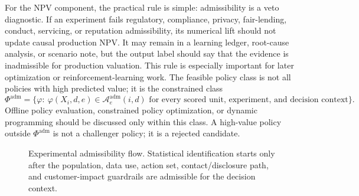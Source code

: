 \documentclass[11pt]{article}
\newcommand{\1}{\mathbf{1}}
\begin{document}
For the NPV component, the practical rule is simple: admissibility is a veto
diagnostic. If an experiment fails regulatory, compliance, privacy,
fair-lending, conduct, servicing, or reputation admissibility, its numerical
lift should not update causal production NPV. It may remain in a learning
ledger, root-cause analysis, or scenario note, but the output label should say
that the evidence is inadmissible for production valuation. This rule is
especially important for later optimization or reinforcement-learning work.
The feasible policy class is not all policies with high predicted value; it is
the constrained class
\begin{equation}
  \Phi^{\mathrm{adm}}
  =
  \{\varphi:\ \varphi(X_i,d,e)\in
    \mathcal{A}^{\mathrm{adm}}_e(i,d)
    \text{ for every scored unit, experiment, and decision context}\}.
  \label{eq:admissible-policy-class}
\end{equation}
Offline policy evaluation, constrained policy optimization, or dynamic
programming should be discussed only within this class. A high-value policy
outside $\Phi^{\mathrm{adm}}$ is not a challenger policy; it is a rejected
candidate.

\begin{figure}[t]
\centering
{}
\caption{Experimental admissibility flow. Statistical identification starts only
after the population, data use, action set, contact/disclosure path, and
customer-impact guardrails are admissible for the decision context.}
\label{fig:experimental-admissibility}
\end{figure}
\end{document}
